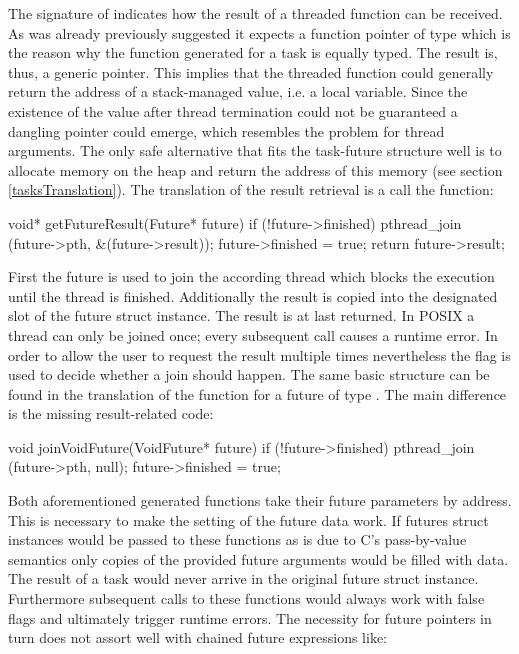 The signature of  indicates how the result of a threaded function can be received. As was already previously suggested it expects a function pointer of type  which is the reason why the function generated for a task is equally typed. The result is, thus, a generic  pointer. This implies that the threaded function could generally return the address of a stack-managed value, i.e. a local variable. Since the existence of the value after thread termination could not be guaranteed a dangling pointer \cite{UnderstandingAndUsingCPointers} could emerge, which resembles the problem for thread arguments. The only safe alternative that fits the task-future structure well is to allocate memory on the heap and return the address of this memory (see section \ref{tasksTranslation}). The translation of the result retrieval is a call the function:

\begin{ccode}
void* getFutureResult(Future* future) { 
  if (!future->finished) { 
    pthread_join (future->pth, &(future->result)); 
    future->finished = true; 
  } 
  return future->result; 
} 
\end{ccode}
First the future is used to join the according thread which blocks the execution until the thread is finished. Additionally the result is copied into the designated slot of the future struct instance. The result is at last returned. In POSIX a thread can only be joined once; every subsequent call causes a runtime error. In order to allow the user to request the result multiple times nevertheless the  flag is used to decide whether a join should happen. The same basic structure can be found in the translation of the  function for a future of type . The main difference is the missing result-related code:
\begin{ccode}
void joinVoidFuture(VoidFuture* future) { 
  if (!future->finished) { 
    pthread_join (future->pth, null); 
    future->finished = true; 
  }
}
\end{ccode}
Both aforementioned generated functions take their future parameters by address. This is necessary to make the setting of the future data work. If futures struct instances would be passed to these functions as is due to C's pass-by-value semantics only copies of the provided future arguments would be filled with data. The result of a task would never arrive in the original future struct instance. Furthermore subsequent calls to these functions would always work with false  flags and ultimately trigger runtime errors. The necessity for future pointers in turn does not assort well with chained future expressions like:

